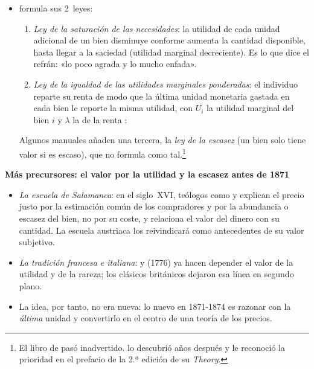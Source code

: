 \documentclass[11pt]{article}
\begin{document}
\begin{itemize}
\begin{itemize}
  \item {} \parencite*{Gossen1854Entwickelung} formula sus 2~leyes:
    \begin{enumerate}
    \item \emph{Ley de la saturación de las necesidades}: la utilidad de cada unidad adicional de un bien disminuye conforme aumenta la cantidad disponible, hasta llegar a la saciedad (utilidad marginal decreciente). Es lo que dice el refrán: «lo poco agrada y lo mucho enfada».
    \item \emph{Ley de la igualdad de las utilidades marginales ponderadas}: el individuo reparte su renta de modo que la última unidad monetaria gastada en cada bien le reporte la misma utilidad, con $U_i$ la utilidad marginal del bien $i$ y $\lambda$ la de la renta :
    \end{enumerate}
    Algunos manuales añaden una tercera, la \emph{ley de la escasez} (un bien solo tiene valor si es escaso)\nocite{Fonseca2026Phases}, que  no formula como tal.\footnote{El libro de  pasó inadvertido.  lo descubrió años después y le reconoció la prioridad en el prefacio de la 2.ª edición de su \emph{Theory}\nocite{Jevons1879Theory}.}
  \end{itemize}
\end{itemize}

\begin{anotaciones}
\textbf{Más precursores: el valor por la utilidad y la escasez antes de 1871}
\begin{itemize}
\item \emph{La escuela de Salamanca}: en el siglo~XVI, teólogos como  y  explican el precio justo por la estimación común de los compradores y por la abundancia o escasez del bien, no por su coste, y  relaciona el valor del dinero con su cantidad\nocite{GriceHutchinson1952Salamanca}. La escuela austriaca los reivindicará como antecedentes de su valor subjetivo.
\item \emph{La tradición francesa e italiana}: \textcite{Galiani1751Moneta} y  (1776) ya hacen depender el valor de la utilidad y de la rareza; los clásicos británicos dejaron esa línea en segundo plano\nocite{Fonseca2026Phases}.
\item La idea, por tanto, no era nueva: lo nuevo en 1871-1874 es razonar con la \emph{última} unidad y convertirlo en el centro de una teoría de los precios.
\end{itemize}
\end{anotaciones}
\end{document}
